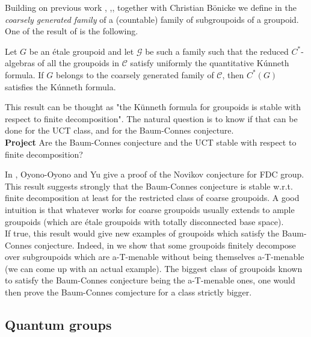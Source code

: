 Building on previous work \cite{OY4}, \cite{GWY},\cite{GWY}, together with Christian B\"onicke we define in \cite{DelBo18} the \textit{coarsely generated family} of a (countable) family of subgroupoids of a groupoid. One of the result of \cite{DelBo18} is the following.

\begin{theorem} Let $G$ be an \'etale groupoid and let $\mathcal G$ be such a family such that the reduced $C^*$-algebras of all the groupoids in $\mathcal C$ satisfy uniformly the quantitative K\'unneth formula. If $G$ belongs to the coarsely generated family of $\mathcal C$, then $C^*(G)$ satisfies the K\'unneth formula.         
\end{theorem}

This result can be thought as "the K\"unneth formula for groupoids is stable with respect to finite decomposition". The natural question is to know if that can be done for the UCT class, and for the Baum-Connes conjecture.\\

\textbf{Project} Are the Baum-Connes conjecture and the UCT stable with respect to finite decomposition?

In \cite{OY4}, Oyono-Oyono and Yu give a proof of the Novikov conjecture for FDC group. This result suggests strongly that the Baum-Connes conjecture is stable w.r.t. finite decomposition at least for the restricted class of coarse groupoids. A good intuition is that whatever works for coarse groupoids usually extends to ample groupoids (which are \'etale groupoids with totally disconnected base space). \\

If true, this result would give new examples of groupoids which satisfy the Baum-Connes conjecture. Indeed, in \cite{DelBo18} we show that some groupoids finitely decompose over subgroupoids which are a-T-menable without being themselves a-T-menable (we can come up with an actual example). The biggest class of groupoids known to satisfy the Baum-Connes conjecture being the a-T-menable ones, one would then prove the Baum-Connes comjecture for a class strictly bigger.

\subsection{Quantum groups}

